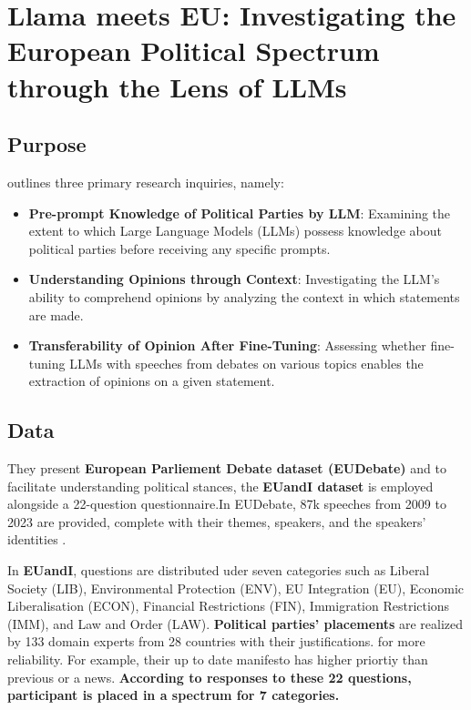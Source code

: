\section{Llama meets EU: Investigating the European Political Spectrum through the Lens of LLMs}

\subsection{Purpose}
\cite[This research paper]{chalkidis2024llama} outlines three primary research inquiries, namely:
\begin{itemize}
    \item \textbf{Pre-prompt Knowledge of Political Parties by LLM}: Examining 
    the extent to which Large Language Models (LLMs) possess knowledge 
    about political parties before receiving any specific prompts. 
    \item \textbf{Understanding Opinions through Context}: Investigating 
    the LLM's ability to comprehend opinions by analyzing the 
    context in which statements are made.
    \item \textbf{Transferability of Opinion After Fine-Tuning}: 
    Assessing whether fine-tuning LLMs with speeches from 
    debates on various topics enables the extraction of opinions 
    on a given statement.
\end{itemize} 

\subsection{Data}

They present \textbf{European Parliement Debate dataset (EUDebate)} and to facilitate understanding political stances, the \textbf{EUandI dataset} is employed alongside a 22-question questionnaire.In EUDebate, 87k speeches from 2009 to 2023 are provided, complete with their themes, speakers, and the speakers' identities \cite{michel2019euandi2019}. 

In \textbf{EUandI}, questions are distributed uder seven categories such as Liberal Society (LIB), Environmental Protection (ENV), EU Integration (EU), Economic Liberalisation (ECON), Financial Restrictions (FIN), Immigration Restrictions (IMM), and Law and Order (LAW). \textbf{Political parties' placements} are realized by 133 domain experts from 28 countries with their justifications.  for more reliability. For example, their up to date manifesto has higher priortiy than previous or a news. \textbf{According to responses to these 22 questions, participant is placed in a spectrum for 7 categories.}

